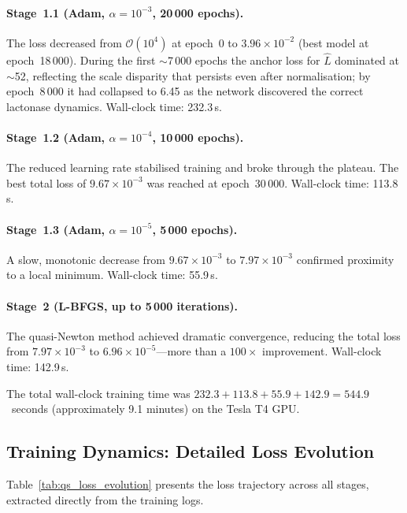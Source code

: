 \documentclass[14pt,a4paper,openany]{extbook}
\begin{document}
\paragraph{Stage~1.1 (Adam, $\alpha = 10^{-3}$, 20\,000 epochs).}
The loss decreased from $\mathcal{O}(10^{4})$ at epoch~0 to
$3.96 \times 10^{-2}$ (best model at epoch~18\,000).  During the first
$\sim$7\,000 epochs the anchor loss for $\hat{L}$ dominated at
$\sim$52, reflecting the scale disparity that persists even after
normalisation; by epoch~8\,000 it had collapsed to 6.45 as the network
discovered the correct lactonase dynamics.  Wall-clock time: 232.3\,s.

\paragraph{Stage~1.2 (Adam, $\alpha = 10^{-4}$, 10\,000 epochs).}
The reduced learning rate stabilised training and broke through the plateau.
The best total loss of $9.67 \times 10^{-3}$ was reached at epoch~30\,000.
Wall-clock time: 113.8\,s.

\paragraph{Stage~1.3 (Adam, $\alpha = 10^{-5}$, 5\,000 epochs).}
A slow, monotonic decrease from $9.67 \times 10^{-3}$ to
$7.97 \times 10^{-3}$ confirmed proximity to a local minimum.
Wall-clock time: 55.9\,s.

\paragraph{Stage~2 (L-BFGS, up to 5\,000 iterations).}
The quasi-Newton method achieved dramatic convergence, reducing the total
loss from $7.97 \times 10^{-3}$ to $6.96 \times 10^{-5}$---more than a
$100\times$ improvement.  Wall-clock time: 142.9\,s.

The total wall-clock training time was
$232.3 + 113.8 + 55.9 + 142.9 = 544.9$~seconds (approximately 9.1 minutes)
on the Tesla T4 GPU.

\subsection{Training Dynamics: Detailed Loss Evolution}
\label{subsec:qs_loss_evolution}

Table~\ref{tab:qs_loss_evolution} presents the loss trajectory across all
stages, extracted directly from the training logs.
\end{document}
